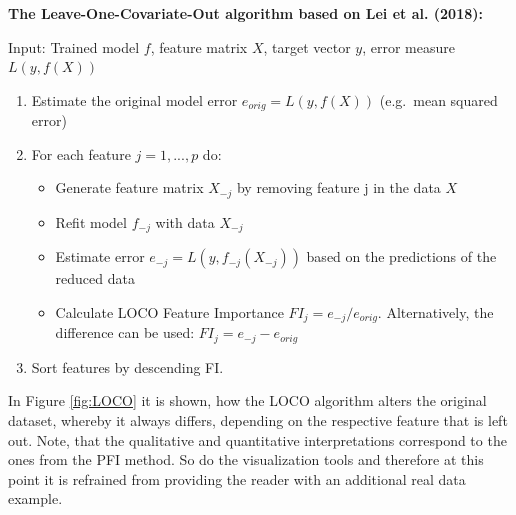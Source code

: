 \documentclass[]{krantz}
\providecommand{\tightlist}{%
  \setlength{\itemsep}{0pt}\setlength{\parskip}{0pt}}
\begin{document}
\textbf{The Leave-One-Covariate-Out algorithm based on Lei et al.
(2018):}

Input: Trained model \(f\), feature matrix \(X\), target vector \(y\),
error measure \(L(y,f(X))\)

\begin{enumerate}
\def\labelenumi{\arabic{enumi}.}
\tightlist
\item
  Estimate the original model error \(e_{orig} = L(y,f(X))\) (e.g.~mean
  squared error)
\item
  For each feature \(j = 1,...,p\) do:

  \begin{itemize}
  \tightlist
  \item
    Generate feature matrix \(X_{-j}\) by removing feature j in the data
    \(X\)
  \item
    Refit model \(f_{-j}\) with data \(X_{-j}\)
  \item
    Estimate error \(e_{-j} = L(y,f_{-j}(X_{-j}))\) based on the
    predictions of the reduced data
  \item
    Calculate LOCO Feature Importance \(FI_{j} = e_{-j}/e_{orig}\).
    Alternatively, the difference can be used:
    \(FI_{j} = e_{-j} - e_{orig}\)
  \end{itemize}
\item
  Sort features by descending FI.
\end{enumerate}

In Figure \ref{fig:LOCO} it is shown, how the LOCO algorithm alters the
original dataset, whereby it always differs, depending on the respective
feature that is left out. Note, that the qualitative and quantitative
interpretations correspond to the ones from the PFI method. So do the
visualization tools and therefore at this point it is refrained from
providing the reader with an additional real data example.
\end{document}
